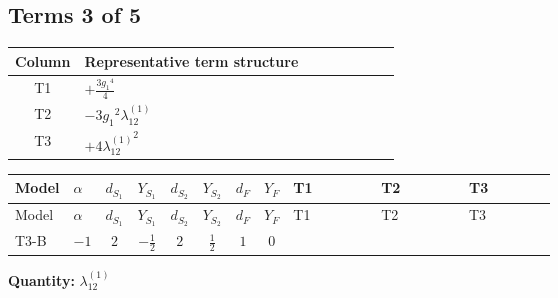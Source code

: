 \documentclass[8pt]{article}
\begin{document}
\begin{landscape}
\subsection*{Terms 3 of 5}
\begin{center}
\begin{tabular}{@{}c >{\raggedright\arraybackslash}p{0.82\linewidth}@{}}
\toprule
Column & Representative term structure \\
\midrule
T1 & \(\displaystyle +\frac{3 {g_1}^4}{4}\) \\
\midrule
T2 & \(\displaystyle -3 {g_1}^2 {\lambda_{12}^{(1)}}\) \\
\midrule
T3 & \(\displaystyle +4 {\lambda_{12}^{(1)}}^2\) \\
\midrule
\bottomrule
\end{tabular}
\end{center}
\smallskip
\tiny
\begin{longtable}{@{}llcccccc >{\raggedright\arraybackslash}p{0.21\linewidth} >{\raggedright\arraybackslash}p{0.21\linewidth} >{\raggedright\arraybackslash}p{0.21\linewidth}@{}}
\toprule
Model & $\alpha$ & $d_{S_1}$ & $Y_{S_1}$ & $d_{S_2}$ & $Y_{S_2}$ & $d_F$ & $Y_F$ & T1 & T2 & T3 \\
\midrule
\endfirsthead
\toprule
Model & $\alpha$ & $d_{S_1}$ & $Y_{S_1}$ & $d_{S_2}$ & $Y_{S_2}$ & $d_F$ & $Y_F$ & T1 & T2 & T3 \\
\midrule
\endhead
T3-B & $-1$ & $2$ & $-\frac{1}{2}$ & $2$ & $\frac{1}{2}$ & $1$ & $0$ & \scriptsize\adjustbox{max width=\linewidth}{$\begin{gathered} +\frac{3 {g_1}^4}{4}\end{gathered}$} & \scriptsize\adjustbox{max width=\linewidth}{$\begin{gathered} -3 {g_1}^2 {\lambda_{12}^{(1)}}\end{gathered}$} & \scriptsize\adjustbox{max width=\linewidth}{$\begin{gathered} +4 {\lambda_{12}^{(1)}}^2\end{gathered}$} \\
\midrule
\bottomrule
\end{longtable}
\clearpage
\noindent\textbf{Quantity: }$\lambda_{12}^{(1)}$\par\smallskip

\end{landscape}
\end{document}
